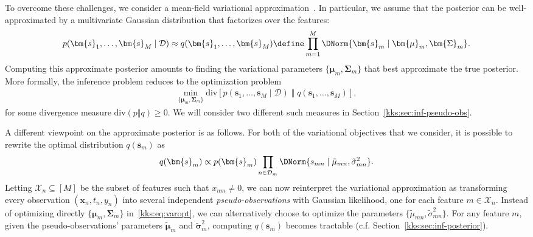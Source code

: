 To overcome these challenges, we consider a mean-field variational approximation~\citep{wainwright2008graphical}.
In particular, we assume that the posterior can be well-approximated by a multivariate Gaussian distribution that factorizes over the features:
\begin{align}
	\label{kks:eq:approxpost}
	p(\bm{s}_1, \ldots, \bm{s}_M \mid \mathcal{D})
	\approx q(\bm{s}_1, \ldots, \bm{s}_M)
	\define \prod_{m = 1}^M \DNorm{\bm{s}_m \mid \bm{\mu}_m, \bm{\Sigma}_m}.
\end{align}
Computing this approximate posterior amounts to finding the variational parameters $\{\bm{\mu}_m, \bm{\Sigma}_m \}$ that best approximate the true posterior.
More formally, the inference problem reduces to the optimization problem
\begin{align}
	\label{kks:eq:varopt}
	\min_{\{\bm{\mu}_m, \bm{\Sigma}_m \}} \mathrm{div} \left[ p(\bm{s}_1, \ldots, \bm{s}_M \mid \mathcal{D}) \;\Vert\; q(\bm{s}_1, \ldots, \bm{s}_M) \right],
\end{align}
for some divergence measure $\mathrm{div}(p \Vert q) \ge 0$.
We will consider two different such measures in Section~\ref{kks:sec:inf-pseudo-obs}.

A different viewpoint on the approximate posterior is as follows.
For both of the variational objectives that we consider, it is possible to rewrite the optimal distribution $q(\bm{s}_m)$ as
\begin{align*}
	q(\bm{s}_m) \propto p(\bm{s}_m) \prod_{n \in \mathcal{D}_m} \DNorm{s_{mn} \mid \tilde{\mu}_{mn}, \tilde{\sigma}^2_{mn}}.
\end{align*}
Letting $\mathcal{X}_n \subseteq [M]$ be the subset of features such that $x_{nm} \ne 0$, we can now reinterpret the variational approximation as transforming every observation $(\bm{x}_n, t_n, y_n)$ into several independent \emph{pseudo-observations} with Gaussian likelihood, one for each feature $m \in \mathcal{X}_n$.
Instead of optimizing directly $\{ \bm{\mu}_m, \bm{\Sigma}_m \}$ in~\eqref{kks:eq:varopt}, we can alternatively choose to optimize the parameters $\{ \tilde{\mu}_{mn}, \tilde{\sigma}^2_{mn} \}$.
For any feature $m$, given the pseudo-observations' parameters $\tilde{\bm{\mu}}_m$ and $\tilde{\bm{\sigma}}_m^2$, computing $q(\bm{s}_m)$ becomes tractable (c.f. Section~\ref{kks:sec:inf-posterior}).

